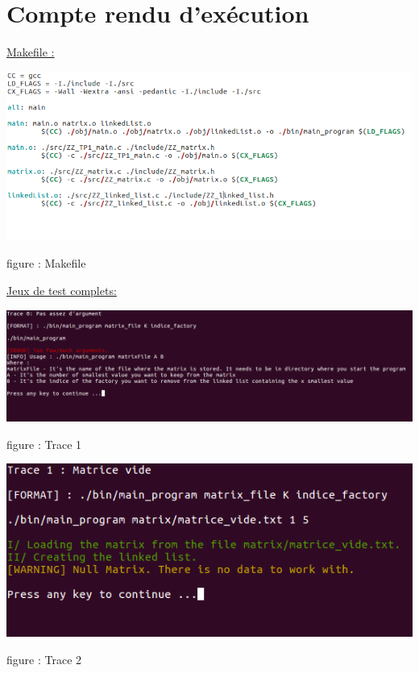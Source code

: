 \documentclass[a4paper]{article}
\begin{document}
\section{Compte rendu d'exécution}

\underline{Makefile :}
\begin{center}
\includegraphics[scale=0.39]{Makefile.png}

figure : Makefile
\end{center}

\underline{Jeux de test complets:}
\begin{center}
\includegraphics[scale=0.4]{trace_1.png}

figure : Trace 1
\end{center}

\begin{center}
\includegraphics[scale=0.4]{trace_2.png}

figure : Trace 2
\end{center}
\end{document}
